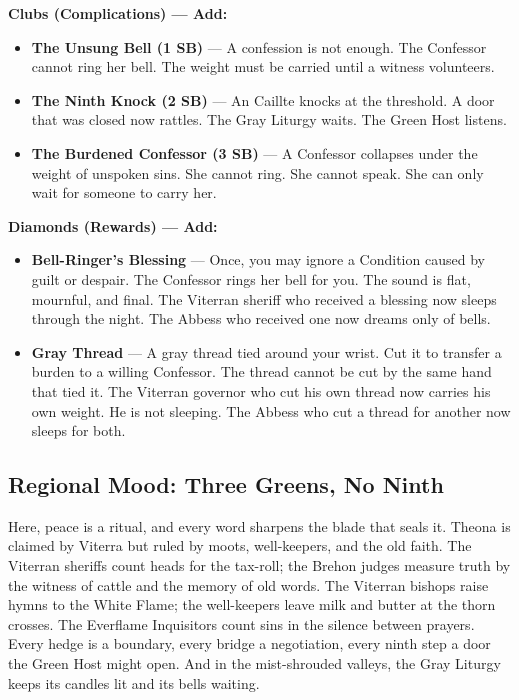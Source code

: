 \textbf{Clubs (Complications) --- Add:}
\begin{itemize}
\item \textbf{The Unsung Bell (1 SB)} --- A confession is not enough. The Confessor cannot ring her bell. The weight must be carried until a witness volunteers.
\item \textbf{The Ninth Knock (2 SB)} --- An Caillte knocks at the threshold. A door that was closed now rattles. The Gray Liturgy waits. The Green Host listens.
\item \textbf{The Burdened Confessor (3 SB)} --- A Confessor collapses under the weight of unspoken sins. She cannot ring. She cannot speak. She can only wait for someone to carry her.
\end{itemize}

\textbf{Diamonds (Rewards) --- Add:}
\begin{itemize}
\item \textbf{Bell-Ringer's Blessing} --- Once, you may ignore a Condition caused by guilt or despair. The Confessor rings her bell for you. The sound is flat, mournful, and final. The Viterran sheriff who received a blessing now sleeps through the night. The Abbess who received one now dreams only of bells.
\item \textbf{Gray Thread} --- A gray thread tied around your wrist. Cut it to transfer a burden to a willing Confessor. The thread cannot be cut by the same hand that tied it. The Viterran governor who cut his own thread now carries his own weight. He is not sleeping. The Abbess who cut a thread for another now sleeps for both.
\end{itemize}

\subsection*{Regional Mood: Three Greens, No Ninth}

Here, peace is a ritual, and every word sharpens the blade that seals it. Theona is claimed by Viterra but ruled by moots, well-keepers, and the old faith. The Viterran sheriffs count heads for the tax-roll; the Brehon judges measure truth by the witness of cattle and the memory of old words. The Viterran bishops raise hymns to the White Flame; the well-keepers leave milk and butter at the thorn crosses. The Everflame Inquisitors count sins in the silence between prayers. Every hedge is a boundary, every bridge a negotiation, every ninth step a door the Green Host might open. And in the mist-shrouded valleys, the Gray Liturgy keeps its candles lit and its bells waiting.

